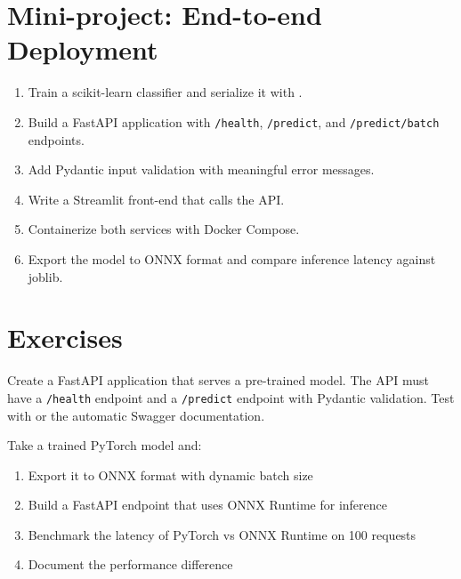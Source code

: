 \section{Mini-project: End-to-end Deployment}
\label{sec:mini-project-ch8}

\begin{miniproject}[title=\textbf{Mini-project 8: Deploy an ML model}]
\begin{enumerate}
  \item Train a scikit-learn classifier and serialize it with
    .
  \item Build a FastAPI application with \texttt{/health},
    \texttt{/predict}, and \texttt{/predict/batch} endpoints.
  \item Add Pydantic input validation with meaningful error messages.
  \item Write a Streamlit front-end that calls the API.
  \item Containerize both services with Docker Compose.
  \item Export the model to ONNX format and compare inference latency
    against joblib.
\end{enumerate}
\end{miniproject}

\section{Exercises}
\label{sec:exercises-ch8}

\begin{exercise}
Create a FastAPI application that serves a pre-trained
 model. The API must have a \texttt{/health}
endpoint and a \texttt{/predict} endpoint with Pydantic validation.
Test with  or the automatic Swagger documentation.
\end{exercise}

\begin{exercise}
Take a trained PyTorch model and:
\begin{enumerate}
  \item Export it to ONNX format with dynamic batch size
  \item Build a FastAPI endpoint that uses ONNX Runtime for inference
  \item Benchmark the latency of PyTorch vs ONNX Runtime on 100
    requests
  \item Document the performance difference
\end{enumerate}
\end{exercise}

